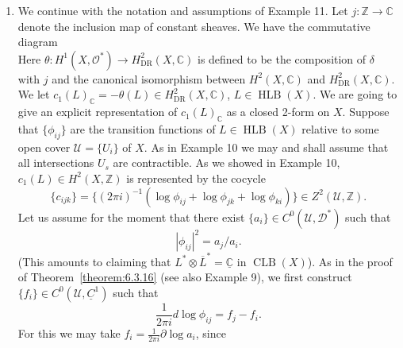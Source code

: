 \begin{enumerate}[start=10]
\[\]
of sheaves on $X$ and we see that $H^1(X,\mathcal O^*)$ is isomorphic to the group $\operatorname{HLB}(X)$ of holomorphic line bundles on $X$. We have the commutative diagram
\[

\]
Here the vertical maps are induced by the natural inclusions of $\mathcal O$ in $\mathscr D$, $\mathcal O^*$ in $\mathscr D^*$ and the identity map of $\mathbb Z$. Hence, as in Example 10, the map $\delta:H^1(X,\mathcal O^*)\to H^2(X,\mathbb Z)$ is minus the first Chern class map. However, the map will generally not be an isomorphism as neither of $H^1(X,\mathcal O)$ and $H^2(X,\mathcal O)$ need vanish. This is just a reflection of the fact that a holomorphic line bundle may be trivial in $\operatorname{CLB}(X)$ but not trivial in $\operatorname{HLB}(X)$. The existence of a Leray cover for $\mathcal O^*$ is now a non-trivial matter as it depends on being able to find covers which are Leray for $\mathcal O$ as well as $\mathbb Z$.
\item We continue with the notation and assumptions of Example 11. Let $j:\mathbb Z\to\mathbb C$ denote the inclusion map of constant sheaves. We have the commutative diagram
\[

\]
Here $\theta:H^1(X,\mathcal O^*)\to H^2_{\mathrm{DR}}(X,\mathbb C)$ is defined to be the composition of $\delta$ with $j$ and the canonical isomorphism between $H^2(X,\mathbb C)$ and $H^2_{\mathrm{DR}}(X,\mathbb C)$. We let $c_1(L)_{\mathbb C}=-\theta(L)\in H^2_{\mathrm{DR}}(X,\mathbb C)$, $L\in\operatorname{HLB}(X)$. We are going to give an explicit representation of $c_1(L)_{\mathbb C}$ as a closed 2-form on $X$. Suppose that $\{\phi_{ij}\}$ are the transition functions of $L\in\operatorname{HLB}(X)$ relative to some open cover $\mathcal U=\{U_i\}$ of $X$. As in Example 10 we may and shall assume that all intersections $U_s$ are contractible. As we showed in Example 10, $c_1(L)\in H^2(X,\mathbb Z)$ is represented by the cocycle
\[
\{c_{ijk}\}=\{(2\pi i)^{-1}(\log\phi_{ij}+\log\phi_{jk}+\log\phi_{ki})\}\in Z^2(\mathcal U,\mathbb Z).
\]
Let us assume for the moment that there exist $\{a_i\}\in C^0(\mathcal U,\mathscr D^*)$ such that
\[
|\phi_{ij}|^2=a_j/a_i.
\]
(This amounts to claiming that $L^*\otimes\overline L^*=\underline{\mathbb C}$ in $\operatorname{CLB}(X)$). As in the proof of Theorem~\ref{theorem:6.3.16} (see also Example 9), we first construct $\{f_i\}\in C^0(\mathcal U,\underline C^1)$ such that
\[
\frac1{2\pi i}d\log\phi_{ij}=f_j-f_i.
\]
For this we may take $f_i=\frac1{2\pi i}\partial\log a_i$, since

\end{enumerate}
